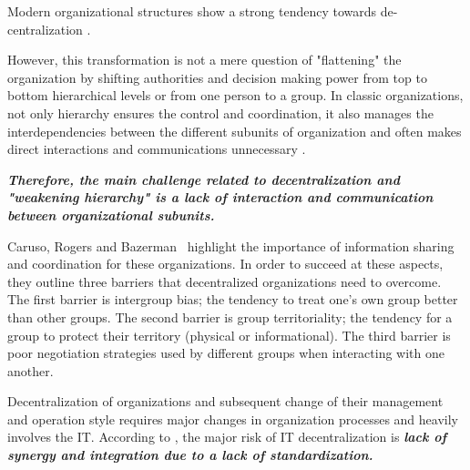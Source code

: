 


Modern organizational structures show a strong tendency towards de-centralization \cite{daft1993}.

However, this transformation is not a mere question of "flattening" the organization by shifting authorities and decision making power from top to bottom hierarchical levels or from one person to a group. In classic organizations, not only hierarchy ensures the control and coordination, it also manages the interdependencies between the different subunits of organization and often makes direct interactions and communications unnecessary \cite{thompson1967}. 

\textit{\textbf{Therefore, the main challenge related to decentralization and "weakening hierarchy" is a lack of interaction and communication between organizational subunits. }}

Caruso, Rogers and Bazerman~\cite{caruso2008boundaries} highlight the importance of information sharing and coordination for these organizations. In order to succeed at these aspects, they outline three barriers that decentralized organizations need to overcome. The first barrier is intergroup bias; the tendency to treat one's own group better than other groups. The second barrier is group territoriality; the tendency for a group to protect their territory (physical or informational). The third barrier is poor negotiation strategies used by different groups when interacting with one another. 

Decentralization of organizations and subsequent change of their management and operation style requires major changes in organization processes and heavily involves the IT. According to \cite{Rockart1996}, the major risk of IT decentralization is\textbf{\textit{ lack of  synergy and integration due to a lack of standardization. }}



